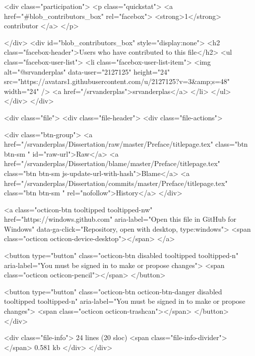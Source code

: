     <div class="participation">
      <p class="quickstat">
        <a href="#blob_contributors_box" rel="facebox">
          <strong>1</strong>
           contributor
        </a>
      </p>
      
    </div>
    <div id="blob_contributors_box" style="display:none">
      <h2 class="facebox-header">Users who have contributed to this file</h2>
      <ul class="facebox-user-list">
          <li class="facebox-user-list-item">
            <img alt="@srvanderplas" data-user="2127125" height="24" src="https://avatars1.githubusercontent.com/u/2127125?v=3&amp;s=48" width="24" />
            <a href="/srvanderplas">srvanderplas</a>
          </li>
      </ul>
    </div>
  </div>

<div class="file">
  <div class="file-header">
    <div class="file-actions">

      <div class="btn-group">
        <a href="/srvanderplas/Dissertation/raw/master/Preface/titlepage.tex" class="btn btn-sm " id="raw-url">Raw</a>
          <a href="/srvanderplas/Dissertation/blame/master/Preface/titlepage.tex" class="btn btn-sm js-update-url-with-hash">Blame</a>
        <a href="/srvanderplas/Dissertation/commits/master/Preface/titlepage.tex" class="btn btn-sm " rel="nofollow">History</a>
      </div>

        <a class="octicon-btn tooltipped tooltipped-nw"
           href="https://windows.github.com"
           aria-label="Open this file in GitHub for Windows"
           data-ga-click="Repository, open with desktop, type:windows">
            <span class="octicon octicon-device-desktop"></span>
        </a>

          <button type="button" class="octicon-btn disabled tooltipped tooltipped-n" aria-label="You must be signed in to make or propose changes">
            <span class="octicon octicon-pencil"></span>
          </button>

        <button type="button" class="octicon-btn octicon-btn-danger disabled tooltipped tooltipped-n" aria-label="You must be signed in to make or propose changes">
          <span class="octicon octicon-trashcan"></span>
        </button>
    </div>

    <div class="file-info">
        24 lines (20 sloc)
        <span class="file-info-divider"></span>
      0.581 kb
    </div>
  </div>
  
